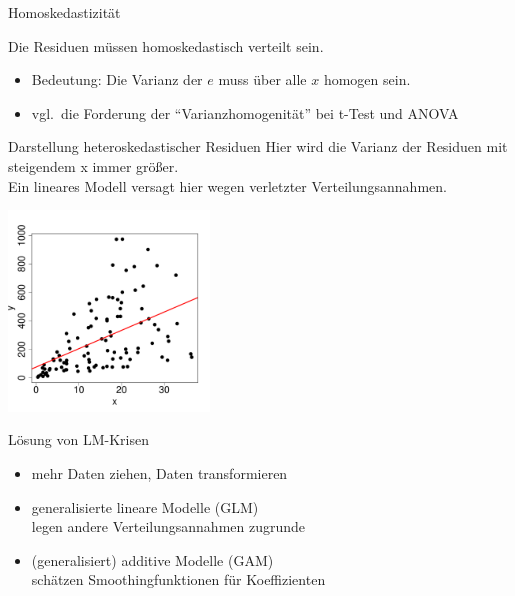 \begin{frame}
  {Homoskedastizität}
  \begin{center}
    \alert{Die Residuen müssen homoskedastisch verteilt sein.}
  \end{center}
  \begin{itemize}[<+->]
    \item Bedeutung: Die Varianz der $e$ muss über alle $x$ homogen sein.
    \item vgl.\ die Forderung der "`Varianzhomogenität"' bei t-Test und ANOVA
  \end{itemize}
\end{frame}

\begin{frame}
  {Darstellung heteroskedastischer Residuen}
  Hier wird die Varianz der Residuen mit steigendem x immer größer.\\
  Ein lineares Modell versagt hier wegen verletzter Verteilungsannahmen.
  \begin{center}
    \includegraphics[width=0.4\textwidth]{graphics/hetresid}
  \end{center}
\end{frame}

\begin{frame}
  {Lösung von LM-Krisen}
  \begin{itemize}[<+->]
    \item mehr Daten ziehen, Daten transformieren
      \vspace{0.5cm}
    \item \alert{generalisierte lineare Modelle (GLM)}\\
      legen andere Verteilungsannahmen zugrunde
      \vspace{0.5cm}
    \item (generalisiert) additive Modelle (GAM)\\
      schätzen Smoothingfunktionen für Koeffizienten
  \end{itemize}
\end{frame}

